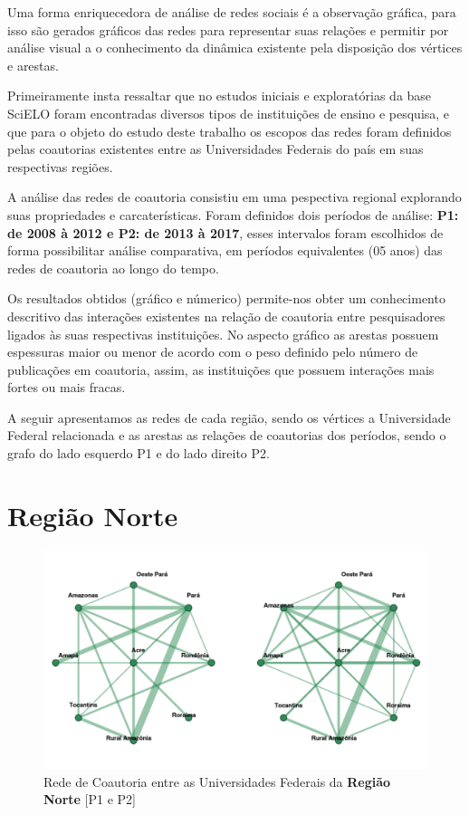 \documentclass[12pt]{article}
\begin{document}
Uma forma enriquecedora de análise de redes sociais é a observação gráfica, para isso são gerados gráficos das redes para representar suas relações e permitir por análise visual a o conhecimento da dinâmica existente pela disposição dos vértices e arestas.

Primeiramente insta ressaltar que no estudos iniciais e exploratórias da base SciELO foram encontradas diversos tipos de instituições de ensino e pesquisa, e que para o objeto do estudo deste trabalho os escopos das redes foram definidos pelas coautorias existentes entre as Universidades Federais do país em suas respectivas regiões. 

A análise das redes de coautoria consistiu em uma pespectiva regional explorando suas propriedades e carcaterísticas. Foram definidos dois períodos de análise: \textbf{P1: de 2008 à 2012 e P2: de 2013 à 2017}, esses intervalos foram escolhidos de forma possibilitar análise comparativa, em períodos equivalentes (05 anos) das redes de coautoria ao longo do tempo.

Os resultados obtidos (gráfico e númerico) permite-nos obter um conhecimento descritivo das interações existentes na relação de coautoria entre pesquisadores ligados às suas respectivas instituições. No aspecto gráfico as arestas possuem espessuras maior ou menor de acordo com o peso definido pelo número de publicações em coautoria, assim, as instituições que possuem interações mais fortes ou mais fracas.

A seguir apresentamos as redes de cada região, sendo os vértices a Universidade Federal relacionada e as arestas as relações de coautorias dos períodos, sendo o grafo do lado esquerdo P1 e do lado direito P2.


\section{Região Norte}

\begin{figure}[H]
\centering
\includegraphics[scale=0.6]{images/norte.pdf}
\caption{Rede de Coautoria entre as Universidades Federais da \textbf{Região Norte} [P1 e P2]}
\label{rede-norte}
\end{figure}
\end{document}
